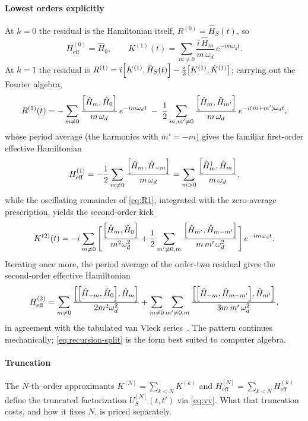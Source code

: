 \documentclass[a4paper,11pt]{article}
\newcommand{\eff}{\mathrm{eff}}
\begin{document}
\paragraph{Lowest orders explicitly}
At $k=0$ the residual is the Hamiltonian itself, $R^{(0)} = \hat H_S(t)$, so
\begin{equation}\label{eq:K1}
  H_\eff^{(0)} = \hat H_0,
  \qquad
  K^{(1)}(t) = \sum_{m\neq0}\frac{i\,\hat H_m}{m\,\omega_d}\, e^{-i m\omega_d t}.
\end{equation}
At $k=1$ the residual is $R^{(1)} = i\comm{K^{(1)}}{\hat H_S(t)} - \tfrac{i}{2}\comm{K^{(1)}}{\dot K^{(1)}}$; carrying out the Fourier algebra,
\begin{equation}\label{eq:R1}
  R^{(1)}(t)
  = -\sum_{m\neq0}\frac{\comm{\hat H_m}{\hat H_0}}{m\,\omega_d}\,e^{-i m\omega_d t}
  \;-\;\frac12\sum_{m,m'\neq0}\frac{\comm{\hat H_m}{\hat H_{m'}}}{m\,\omega_d}\,e^{-i (m+m')\omega_d t},
\end{equation}
whose period average (the harmonics with $m' = -m$) gives the familiar first-order effective Hamiltonian
\begin{equation}\label{eq:Heff1}
  H_\eff^{(1)}
  = -\frac12\sum_{m\neq0}\frac{\comm{\hat H_m}{\hat H_{-m}}}{m\,\omega_d}
  = \sum_{m>0}\frac{\comm{\hat H_m^\dagger}{\hat H_m}}{m\,\omega_d},
\end{equation}
while the oscillating remainder of \cref{eq:R1}, integrated with the zero-average prescription, yields the second-order kick
\begin{equation}\label{eq:K2}
  K^{(2)}(t)
  = -i\sum_{m\neq0}\Bigg[\frac{\comm{\hat H_m}{\hat H_0}}{m^2\omega_d^2}
  + \frac12\sum_{m'\neq0,m}\frac{\comm{\hat H_{m'}}{\hat H_{m-m'}}}{m\,m'\,\omega_d^2}\Bigg]\,e^{-i m\omega_d t}.
\end{equation}
Iterating once more, the period average of the order-two residual gives the second-order effective Hamiltonian
\begin{equation}\label{eq:Heff2}
  H_\eff^{(2)}
  = \sum_{m\neq0}\frac{\comm{\comm{\hat H_{-m}}{\hat H_0}}{\hat H_m}}{2m^2\omega_d^2}
  + \sum_{m\neq0}\sum_{m'\neq0,m}\frac{\comm{\comm{\hat H_{-m}}{\hat H_{m-m'}}}{\hat H_{m'}}}{3m\,m'\,\omega_d^2},
\end{equation}
in agreement with the tabulated van Vleck series~\cite{Eckardt2015High,Mikami2016Brillouin,Ikeda2021}. The pattern continues mechanically; \cref{eq:recursion-split} is the form best suited to computer algebra.

\paragraph{Truncation}
The $N$-th--order approximants $K^{[N]} = \sum_{k<N}K^{(k)}$ and $H_\eff^{[N]} = \sum_{k<N}H_\eff^{(k)}$ define the truncated factorization $U_S^{[N]}(t,t')$ via \cref{eq:vv}. What that truncation costs, and how it fixes $N$, is priced separately.
\end{document}
